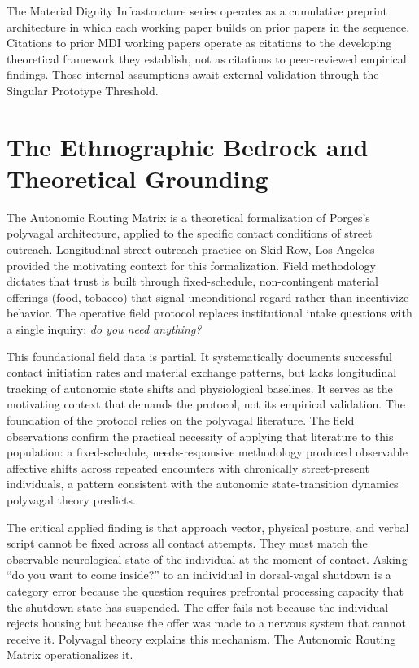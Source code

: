 \documentclass[12pt, letterpaper]{article}
\begin{document}
The Material Dignity Infrastructure series operates as a cumulative preprint architecture in which each working paper builds on prior papers in the sequence. Citations to prior MDI working papers operate as citations to the developing theoretical framework they establish, not as citations to peer-reviewed empirical findings. Those internal assumptions await external validation through the Singular Prototype Threshold.

\newpage
\begingroup
{}
\setlength{\cftbeforesecskip}{2pt}
\setlength{\cftbeforesubsecskip}{-2pt}
\tableofcontents
\endgroup

\clearpage
{}

\clearpage
\section{The Ethnographic Bedrock and Theoretical Grounding}

The Autonomic Routing Matrix is a theoretical formalization of Porges's polyvagal architecture, applied to the specific contact conditions of street outreach. Longitudinal street outreach practice on Skid Row, Los Angeles provided the motivating context for this formalization. Field methodology dictates that trust is built through fixed-schedule, non-contingent material offerings (food, tobacco) that signal unconditional regard rather than incentivize behavior. The operative field protocol replaces institutional intake questions with a single inquiry: \textit{do you need anything?}

This foundational field data is partial. It systematically documents successful contact initiation rates and material exchange patterns, but lacks longitudinal tracking of autonomic state shifts and physiological baselines. It serves as the motivating context that demands the protocol, not its empirical validation. The foundation of the protocol relies on the polyvagal literature. The field observations confirm the practical necessity of applying that literature to this population: a fixed-schedule, needs-responsive methodology produced observable affective shifts across repeated encounters with chronically street-present individuals, a pattern consistent with the autonomic state-transition dynamics polyvagal theory predicts.

The critical applied finding is that approach vector, physical posture, and verbal script cannot be fixed across all contact attempts. They must match the observable neurological state of the individual at the moment of contact. Asking ``do you want to come inside?'' to an individual in dorsal-vagal shutdown is a category error because the question requires prefrontal processing capacity that the shutdown state has suspended. The offer fails not because the individual rejects housing but because the offer was made to a nervous system that cannot receive it. Polyvagal theory explains this mechanism. The Autonomic Routing Matrix operationalizes it.
\end{document}
